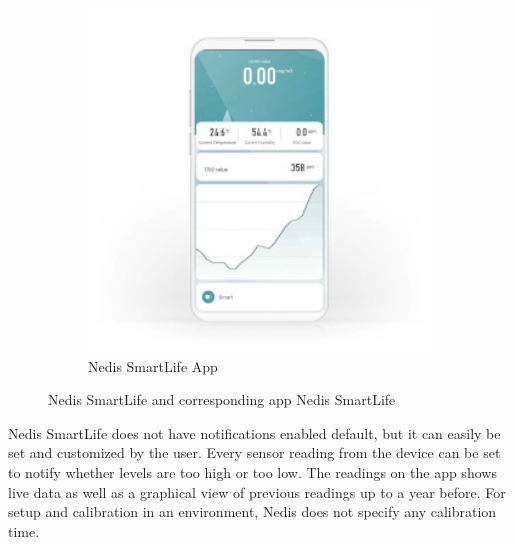 \begin{figure} [H]
\begin{subfigure}{0.35\textwidth}
         \includegraphics[width=1.2\textwidth]{figures/NedisApp.jpg}
         \caption{Nedis SmartLife App \cite{Nedis}}
         \label{fig:NedisDev}
     \end{subfigure}
     \caption{Nedis SmartLife and corresponding app Nedis SmartLife}
     \label{fig:NedisBoth}
\end{figure}

Nedis SmartLife does not have notifications enabled default, but it can easily be set and customized by the user. Every sensor reading from the device can be set to notify whether levels are too high or too low. The readings on the app shows live data as well as a graphical view of previous readings up to a year before. For setup and calibration in an environment, Nedis does not specify any calibration time.  


